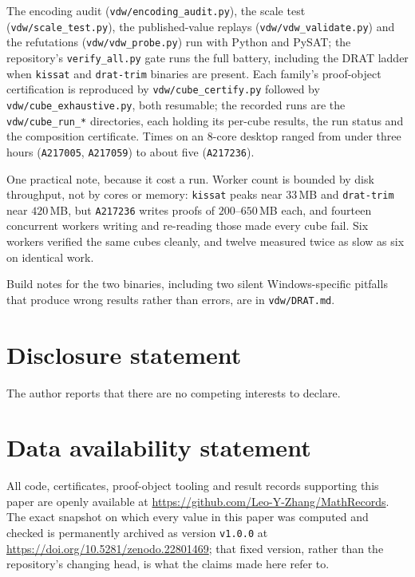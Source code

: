 \documentclass[12pt]{article}
\theoremstyle{remark}
\newcommand{\seq}[1]{\texttt{#1}}
\begin{document}
\noindent The encoding audit (\texttt{vdw/encoding\_audit.py}), the scale
test (\texttt{vdw/scale\_test.py}), the published-value replays
(\texttt{vdw/vdw\_validate.py}) and the refutations
(\texttt{vdw/vdw\_probe.py}) run with Python and PySAT; the repository's
\texttt{verify\_all.py} gate runs the full battery, including the DRAT
ladder when \texttt{kissat} and \texttt{drat-trim} binaries are present.
Each family's proof-object certification is reproduced by
\texttt{vdw/cube\_certify.py} followed by \texttt{vdw/cube\_exhaustive.py},
both resumable; the recorded runs are the \texttt{vdw/cube\_run\_*}
directories, each holding its per-cube results, the run status and the
composition certificate. Times on an 8-core desktop ranged from under three
hours (\seq{A217005}, \seq{A217059}) to about five (\seq{A217236}).

One practical note, because it cost a run. Worker count is bounded by disk
throughput, not by cores or memory: \texttt{kissat} peaks near $33$\,MB and
\texttt{drat-trim} near $420$\,MB, but \seq{A217236} writes proofs of
$200$--$650$\,MB each, and fourteen concurrent workers writing and re-reading
those made every cube fail. Six workers verified the same cubes cleanly, and
twelve measured twice as slow as six on identical work.

Build notes for the two binaries, including two silent Windows-specific
pitfalls that produce wrong results rather than errors, are in
\texttt{vdw/DRAT.md}.

\section*{Disclosure statement}

The author reports that there are no competing interests to declare.

\section*{Data availability statement}

All code, certificates, proof-object tooling and result records supporting this
paper are openly available at \url{https://github.com/Leo-Y-Zhang/MathRecords}.
The exact snapshot on which every value in this paper was computed and checked
is permanently archived as version \texttt{v1.0.0} at
\url{https://doi.org/10.5281/zenodo.22801469}; that fixed version, rather than
the repository's changing head, is what the claims made here refer to.
\end{document}
